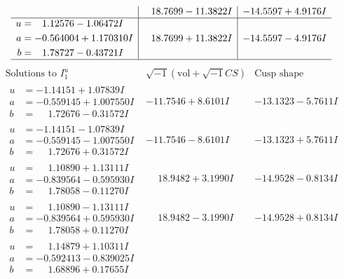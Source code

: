 \documentclass[1p]{elsarticle_modified}
\theoremstyle{definition}
\newcommand{\I}{\sqrt{-1}}
\begin{document}
$$\begin{array}{c|c|c}
 & \phantom{-}18.7699 - 11.3822 I & -14.5597 + 4.9176 I \\ \hline\begin{aligned}
u &= \phantom{-}1.12576 - 1.06472 I \\
a &= -0.564004 + 1.170310 I \\
b &= \phantom{-}1.78727 - 0.43721 I\end{aligned}
 & \phantom{-}18.7699 + 11.3822 I & -14.5597 - 4.9176 I\\
 \hline 
 \end{array}$$\newpage$$\begin{array}{c|c|c}  
\text{Solutions to }I^u_{1}& \I (\text{vol} + \sqrt{-1}CS) & \text{Cusp shape}\\
 \hline 
\begin{aligned}
u &= -1.14151 + 1.07839 I \\
a &= -0.559145 + 1.007550 I \\
b &= \phantom{-}1.72676 - 0.31572 I\end{aligned}
 & -11.7546 + 8.6101 I & -13.1323 - 5.7611 I \\ \hline\begin{aligned}
u &= -1.14151 - 1.07839 I \\
a &= -0.559145 - 1.007550 I \\
b &= \phantom{-}1.72676 + 0.31572 I\end{aligned}
 & -11.7546 - 8.6101 I & -13.1323 + 5.7611 I \\ \hline\begin{aligned}
u &= \phantom{-}1.10890 + 1.13111 I \\
a &= -0.839564 - 0.595930 I \\
b &= \phantom{-}1.78058 - 0.11270 I\end{aligned}
 & \phantom{-}18.9482 + 3.1990 I & -14.9528 - 0.8134 I \\ \hline\begin{aligned}
u &= \phantom{-}1.10890 - 1.13111 I \\
a &= -0.839564 + 0.595930 I \\
b &= \phantom{-}1.78058 + 0.11270 I\end{aligned}
 & \phantom{-}18.9482 - 3.1990 I & -14.9528 + 0.8134 I \\ \hline\begin{aligned}
u &= \phantom{-}1.14879 + 1.10311 I \\
a &= -0.592413 - 0.839025 I \\
b &= \phantom{-}1.68896 + 0.17655 I\end{aligned}

\end{array}$$
\end{document}
